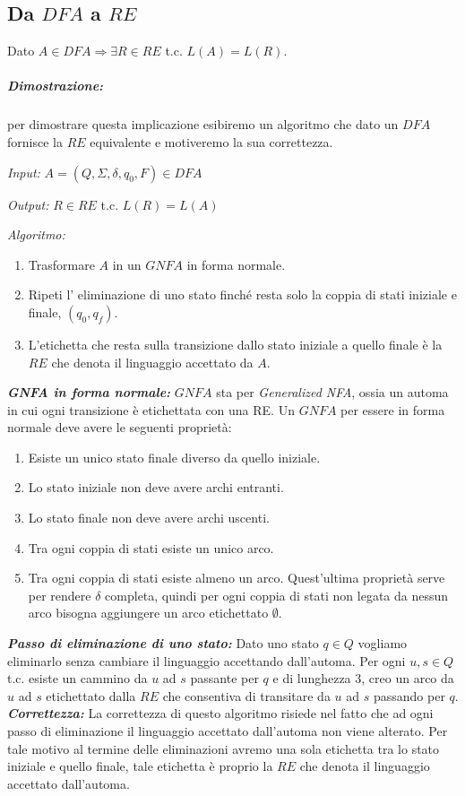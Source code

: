 \subsection{Da $DFA$ a $RE$}
Dato $A \in DFA \Rightarrow \exists R \in RE$ t.c. $L(A) = L(R)$.
\subparagraph{Dimostrazione:} per dimostrare questa implicazione esibiremo un algoritmo che dato un $DFA$ fornisce la $RE$ equivalente e motiveremo la sua correttezza.
\begin{description}
	\item \emph{Input:} $A = (Q, \Sigma, \delta, q_0 , F ) \in DFA$
	\item \emph{Output:} $R \in RE$ t.c. $L(R) = L(A)$
	\item \emph{Algoritmo:}
		\begin{enumerate}
			\item Trasformare $A$ in un $GNFA$ in forma normale.
			\item Ripeti l' eliminazione di uno stato finch\'e resta solo la coppia di stati iniziale e finale, $(q_0 , q_f )$.
			\item L'etichetta che resta sulla transizione dallo stato iniziale a quello finale \`e la $RE$ che denota il linguaggio accettato da $A$.
		\end{enumerate}
\end{description}
\textbf{\emph{GNFA in forma normale:}}\newline
$GNFA$ sta per \emph{Generalized NFA}, ossia un automa in cui ogni transizione \`e etichettata con una RE. Un $GNFA$ per essere in forma normale deve avere le seguenti
propriet\`a:
\begin{enumerate}
	\item Esiste un unico stato finale diverso da quello iniziale.
	\item Lo stato iniziale non deve avere archi entranti.
	\item Lo stato finale non deve avere archi uscenti.
	\item Tra ogni coppia di stati esiste un unico arco.
	\item Tra ogni coppia di stati esiste almeno un arco. Quest'ultima propriet\`a serve per rendere $\delta$ completa, quindi per ogni coppia di stati non legata da nessun arco bisogna aggiungere un arco etichettato $\emptyset$.
\end{enumerate}
\textbf{\emph{Passo di eliminazione di uno stato:}}\newline
Dato uno stato $q \in Q$ vogliamo eliminarlo senza cambiare il linguaggio accettando dall'automa. Per ogni $u, s \in Q $ t.c. esiste un cammino da $u$ ad $s$ passante per $q$ e di lunghezza 3, creo un arco da $u$ ad $s$ etichettato dalla $RE$ che consentiva di transitare da $u$ ad $s$ passando per $q$.\newline
\textbf{\emph{Correttezza:}}\newline
La correttezza di questo algoritmo risiede nel fatto che ad ogni passo di eliminazione il linguaggio accettato dall'automa non viene alterato. Per tale motivo al termine delle eliminazioni avremo una sola etichetta tra lo stato iniziale e quello finale, tale etichetta \`e proprio la $RE$ che denota il linguaggio accettato dall'automa.
